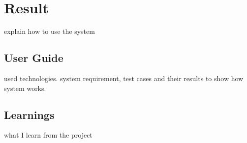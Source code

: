 
\chapter{Result} %

\label{ch:result} %

explain how to use the system

\section{User Guide}

used technologies. system requirement, test cases and their results to show how system works.

\section{Learnings}

what I learn from the project
